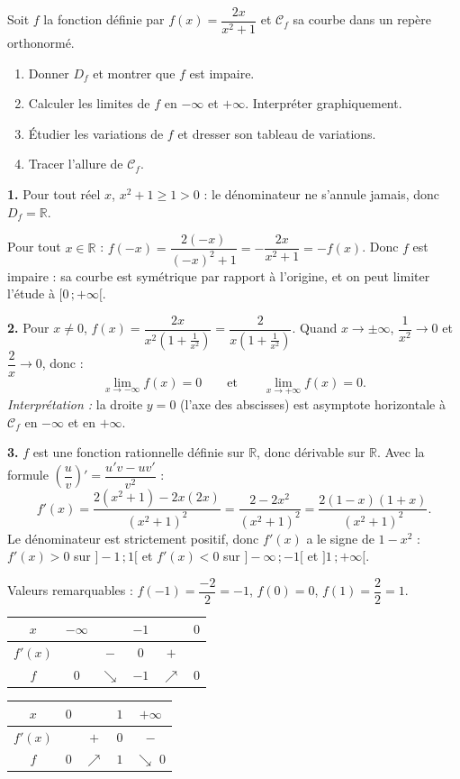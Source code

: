 \documentclass[11pt]{article}
\newcommand{\cle}[1]{{\popxbold\color{popdark}#1}}
\begin{document}
\begin{exoresolu}
Soit $f$ la fonction définie par $f(x)=\dfrac{2x}{x^2+1}$ et $\mathcal{C}_f$ sa courbe dans un repère orthonormé.
\begin{enumerate}
\item Donner $D_f$ et montrer que $f$ est impaire.
\item Calculer les limites de $f$ en $-\infty$ et $+\infty$. Interpréter graphiquement.
\item Étudier les variations de $f$ et dresser son tableau de variations.
\item Tracer l'allure de $\mathcal{C}_f$.
\end{enumerate}
\tcblower
\textbf{1.} Pour tout réel $x$, $x^2+1\geq 1>0$ : le dénominateur ne s'annule jamais, donc $D_f=\mathbb{R}$.

Pour tout $x\in\mathbb{R}$ : $f(-x)=\dfrac{2(-x)}{(-x)^2+1}=-\dfrac{2x}{x^2+1}=-f(x)$. Donc $f$ est \cle{impaire} : sa courbe est symétrique par rapport à l'origine, et on peut limiter l'étude à $[0\,;+\infty[$.

\textbf{2.} Pour $x\neq 0$, $f(x)=\dfrac{2x}{x^2\left(1+\frac{1}{x^2}\right)}=\dfrac{2}{x\left(1+\frac{1}{x^2}\right)}$. Quand $x\to\pm\infty$, $\dfrac{1}{x^2}\to 0$ et $\dfrac{2}{x}\to 0$, donc :
\[ \lim_{x\to -\infty}f(x)=0 \qquad \text{et} \qquad \lim_{x\to +\infty}f(x)=0. \]
\emph{Interprétation :} la droite $y=0$ (l'axe des abscisses) est \cle{asymptote horizontale} à $\mathcal{C}_f$ en $-\infty$ et en $+\infty$.

\textbf{3.} $f$ est une fonction rationnelle définie sur $\mathbb{R}$, donc dérivable sur $\mathbb{R}$. Avec la formule $\left(\dfrac{u}{v}\right)'=\dfrac{u'v-uv'}{v^2}$ :
\[ f'(x)=\frac{2(x^2+1)-2x(2x)}{(x^2+1)^2}=\frac{2-2x^2}{(x^2+1)^2}=\frac{2(1-x)(1+x)}{(x^2+1)^2}. \]
Le dénominateur est strictement positif, donc $f'(x)$ a le signe de $1-x^2$ : $f'(x)>0$ sur $]-1\,;1[$ et $f'(x)<0$ sur $]-\infty\,;-1[$ et $]1\,;+\infty[$.

Valeurs remarquables : $f(-1)=\dfrac{-2}{2}=-1$, $f(0)=0$, $f(1)=\dfrac{2}{2}=1$.

\begin{center}
\begin{tabular}{|c|ccccc|}\hline
$x$ & $-\infty$ & & $-1$ & & $0$ \\ \hline
$f'(x)$ & & $-$ & $0$ & $+$ & \\ \hline
$f$ & $0$ & $\searrow$ & $-1$ & $\nearrow$ & $0$ \\ \hline
\end{tabular}
\quad
\begin{tabular}{|c|cccc|}\hline
$x$ & $0$ & & $1$ & $+\infty$ \\ \hline
$f'(x)$ & & $+$ & $0$ & $-$ \\ \hline
$f$ & $0$ & $\nearrow$ & $1$ & $\searrow$ \quad $0$ \\ \hline
\end{tabular}
\end{center}


\end{exoresolu}
\end{document}
